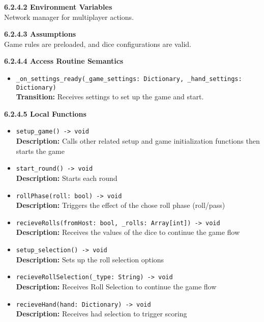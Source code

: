 \documentclass[12pt, titlepage]{article}
\begin{document}
\textbf{6.2.4.2 Environment Variables}\\
Network manager for multiplayer actions.

\textbf{6.2.4.3 Assumptions}\\
Game rules are preloaded, and dice configurations are valid.

\textbf{6.2.4.4 Access Routine Semantics}
\begin{itemize}
    \item \texttt{\_on\_settings\_ready(\_game\_settings: Dictionary, \_hand\_settings: Dictionary)}\\
    \textbf{Transition:} Receives settings to set up the game and start.
\end{itemize}

\textbf{6.2.4.5 Local Functions}
\begin{itemize}
    \item \texttt{setup\_game() -> void}\\
    \textbf{Description:} Calls other related setup and game initialization functions then starts the game 
    
    \item \texttt{start\_round() -> void}\\
    \textbf{Description:} Starts each round
    
    \item \texttt{rollPhase(roll: bool) -> void}\\
    \textbf{Description:} Triggers the effect of the chose roll phase (roll/pass)
    
    \item \texttt{recieveRolls(fromHost: bool, \_rolls: Array[int]) -> void}\\
    \textbf{Description:} Receives the values of the dice to continue the game flow
    
    \item \texttt{setup\_selection() -> void}\\
    \textbf{Description:} Sets up the roll selection options
    
    \item \texttt{recieveRollSelection(\_type: String) -> void}\\
    \textbf{Description:} Receives Roll Selection to continue the game flow
    
    \item \texttt{recieveHand(hand: Dictionary) -> void}\\
    \textbf{Description:} Receives had selection to trigger scoring
    

\end{itemize}
\end{document}

